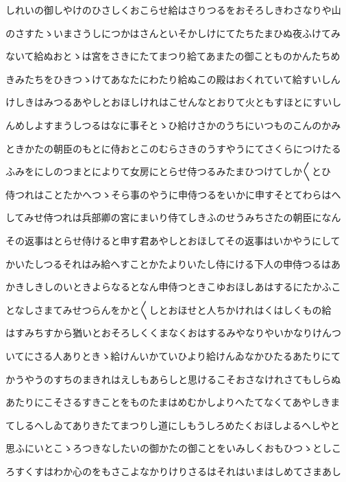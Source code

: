 \documentclass[a4paper,11pt,landscape]{ltjtarticle}
\begin{document}
しれいの御しやけのひさしくおこらせ給はさりつるをおそろしきわさなりや山
\par\medskip
のさすたゝいまさうしにつかはさんといそかしけにてたちたまひぬ夜ふけてみ
\par\medskip
ないて給ぬおとゝは宮をさきにたてまつり給てあまたの御ことものかんたちめ
\par\medskip
きみたちをひきつゝけてあなたにわたり給ぬこの殿はおくれていて給すいしん
\par\medskip
けしきはみつるあやしとおほしけれはこせんなとおりて火ともすほとにすいし
\par\medskip
んめしよすまうしつるはなに事そとゝひ給けさかのうちにいつものこんのかみ
\par\medskip
ときかたの朝臣のもとに侍おとこのむらさきのうすやうにてさくらにつけたる
\par\medskip
ふみをにしのつまとによりて女房にとらせ侍つるみたまひつけてしか〱とひ
\par\medskip
侍つれはことたかへつゝそら事のやうに申侍つるをいかに申すそとてわらはへ
\par\medskip
してみせ侍つれは兵部卿の宮にまいり侍てしきふのせうみちさたの朝臣になん
\par\medskip
その返事はとらせ侍けると申す君あやしとおほしてその返事はいかやうにして
\par\medskip
かいたしつるそれはみ給へすことかたよりいたし侍にける下人の申侍つるはあ
\par\medskip
かきしきしのいときよらなるとなん申侍つときこゆおほしあはするにたかふこ
\par\medskip
となしさまてみせつらんをかと〱しとおほせと人ちかけれはくはしくもの給
\par\medskip
はすみちすから猶いとおそろしくくまなくおはするみやなりやいかなりけんつ
\par\medskip
いてにさる人ありときゝ給けんいかていひより給けんゐなかひたるあたりにて
\par\medskip
かうやうのすちのまきれはえしもあらしと思けるこそおさなけれさてもしらぬ
\par\medskip
あたりにこそさるすきことをものたまはめむかしよりへたてなくてあやしきま
\par\medskip
てしるへしゐてありきたてまつりし道にしもうしろめたくおほしよるへしやと
\par\medskip
思ふにいとこゝろつきなしたいの御かたの御ことをいみしくおもひつゝとしこ
\par\medskip
ろすくすはわか心のをもさこよなかりけりさるはそれはいまはしめてさまあし
\par\medskip
\end{document}

